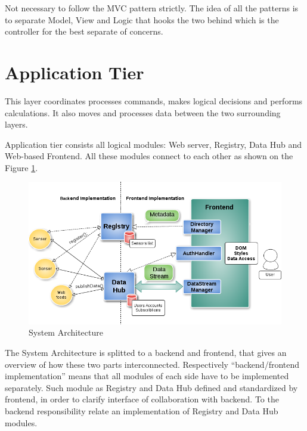   Not necessary to follow the MVC pattern strictly. The idea of all the patterns is to separate Model, View and Logic that hooks the two behind which is the controller for the best separate of concerns.

\section{Application Tier}
  This layer coordinates processes commands, makes logical decisions and performs calculations. It also moves and processes data between the two surrounding layers.

  Application tier consists all logical modules: Web server, Registry, Data Hub and Web-based Frontend. All these modules connect to each other as shown on the Figure \ref{img:structure}. 
    \begin{figure}[!ht]
    \centering
    \includegraphics[scale=0.6]{images/Structure.png}   
    \caption[System Architecture]{System Architecture} 
    \label{img:structure}                        
    \end{figure}

    The System Architecture is splitted to a backend and frontend, that gives an overview of how these two parts interconnected. Respectively ``backend/frontend implementation'' means that all modules of each side have to be implemented separately. Such module as Registry and Data Hub defined and standardized by frontend, in order to clarify interface of collaboration with backend. To the backend responsibility relate an implementation of Registry and Data Hub modules.

